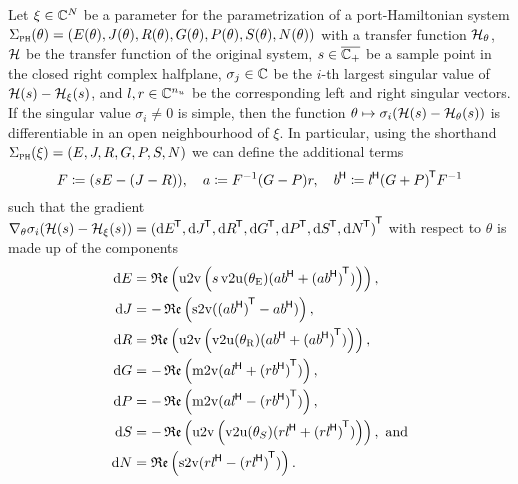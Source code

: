 
\begin{theorem}\label{lem:inner-sobmor-gradient}
    Let $\xi \in \mathbb{C}^{N}$ be a parameter for the parametrization of a port-Hamiltonian system $\Sigma_{\textnormal{\scshape ph}}(\theta) = (E(\theta), J(\theta), R(\theta), G(\theta), P(\theta), S(\theta), N(\theta))$ with a transfer function $\mathcal{H}_\theta$, $\mathcal{H}$ be the transfer function of the original system, $s \in \overline{\mathbb{C}_+}$ be a sample point in the closed right complex halfplane, $\sigma_j \in \mathbb{C}$ be the $i$-th largest singular value of $\mathcal{H}(s) - \mathcal{H}_\xi(s)$, and $l, r \in \mathbb{C}^{n_u}$ be the corresponding left and right singular vectors.
    If the singular value $\sigma_i \neq 0$ is simple, then the function $\theta \mapsto \sigma_i(\mathcal{H}(s) - \mathcal{H}_\theta(s))$ is differentiable in an open neighbourhood of $\xi$.
    In particular, using the shorthand $\Sigma_{\textnormal{\scshape ph}}(\xi) = (E, J, R, G, P, S, N)$ we can define the additional terms
    \begin{equation}\label{eq:inner-sobmor-gradient-helpers}
        F \coloneqq (s E - (J - R)),\quad a \coloneqq F^{-1} (G - P) r,\quad b^{\mkern-1.5mu \mathsf{H}} \coloneqq l^{\mkern-1.5mu \mathsf{H}} {(G + P)}^{\mkern-1.5mu \mathsf{T}} F^{-1}
    \end{equation}
    such that the gradient $\nabla_\theta \sigma_i(\mcl{H}(s) - \mcl{H}_\xi(s)) = {({\dif E}\trans, {\dif J}\trans, {\dif R}\trans, {\dif G}\trans, {\dif P}\trans, {\dif S}\trans, {\dif N}\trans)}\trans$ with respect to $\theta$ is made up of the components
    \begin{equation}\label{eq:inner-sobmor-gradient-components}
        \begin{aligned}
            \dif E &= \re{\uppervec\left( s \vecupper(\theta_\msc{E}) (a b\herm + {(a b\herm)}\trans) \right)}, \\
            \dif J &= - \re{\strictvec({(a b\herm)}\trans - a b\herm)}, \\
            \dif R &= \re{\uppervec\left( \vecupper(\theta_\msc{R}) (a b\herm + {(a b\herm)}\trans) \right)}, \\
            \dif G &= - \re{\matvec(a l\herm + {(r b\herm)}\trans)}, \\
            \dif P &= - \re{\matvec(a l\herm - {(r b\herm)}\trans)}, \\
            \dif S &= - \re{\uppervec\left( \vecupper(\theta_S) (r l\herm + {(r l\herm)}\trans) \right)}, \text{ and} \\
            \dif N &= \re{\strictvec(r l\herm - {(r l\herm)}\trans)}.
        \end{aligned}
    \end{equation}

\end{theorem}

